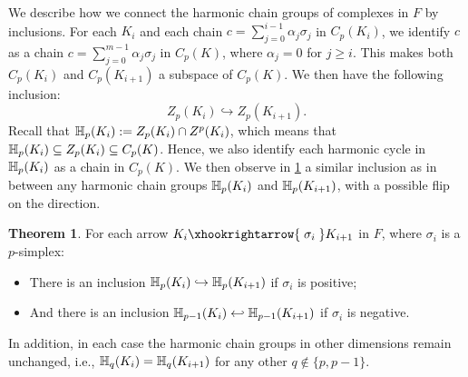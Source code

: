 \documentclass[10pt,a4paper]{amsart}
\newcommand {\mm}[1] {\ifmmode{#1}\else{\mbox{\(#1\)}}\fi}
\newcommand{\har}           {\mm{\mathbb{H}}}
\theoremstyle{definition}
\newcommand{\filt}{F}
\newcommand{\filtcnt}{m}
\newcommand{\fsimp}{\sigma}
\newcommand{\lbarrowspace}{\;}
\newcommand{\incto}{\hookrightarrow}
\newcommand{\inctosp}[1]{\xhookrightarrow{\lbarrowspace#1\lbarrowspace}}
\newcommand{\bakincto}{\hookleftarrow}
\newcommand{\Chn}{C}
\newcommand{\Zyc}{Z}
\newcommand{\aG}{\alpha}
\newtheorem{theorem}{Theorem}
\theoremstyle{remark}
\begin{document}
We describe how we connect the harmonic chain groups of complexes in $\filt$ by inclusions.
For each $K_i$ and each chain $c=\sum_{j=0}^{i-1}\aG_j\fsimp_j$ in $\Chn_p(K_i)$,
we identify $c$ as a chain $c=\sum_{j=0}^{\filtcnt-1}\aG_j\fsimp_j$ in $\Chn_p(K)$,
where $\aG_j=0$ for $j\geq i$.
This makes 
both 
$\Chn_p(K_i)$ and $\Chn_p(K_{i+1})$ a subspace of $\Chn_p(K)$. 
We then have the following inclusion:
\begin{equation}
\label{eqn:zyc-inc}
\Zyc_p(K_i) \incto \Zyc_p(K_{i+1}).
\end{equation}
Recall that $\har_p(K_i):=\Zyc_p(K_i)\cap \Zyc^p(K_i)$, which means that
$\har_p(K_i)\subseteq \Zyc_p(K_i) \subseteq \Chn_p(K)$.
Hence, we also identify each harmonic cycle in $\har_p(K_i)$ as a chain in $\Chn_p(K)$. 
We then observe in \cref{thm:harmonic-inclusion}
 a similar inclusion as in  between any harmonic chain groups $\har_p(K_i)$ and $\har_p(K_{i+1})$,
with a possible flip on the direction.
\begin{theorem}
\label{thm:harmonic-inclusion}
For each arrow $K_i \inctosp{\fsimp_i} K_{i+1}$ in $\filt$, where $\fsimp_i$ is 
a $p$-simplex:  
\begin{itemize}
\item There is an inclusion $\har_p(K_i)\incto \har_p(K_{i+1})$
if $\fsimp_i$ is positive;
\item And there is an inclusion $\har_{p-1}(K_i)\bakincto\har_{p-1}(K_{i+1})$ if $\fsimp_i$ is negative.
\end{itemize}
In addition, in each case the harmonic chain groups in other dimensions remain unchanged, i.e., $\har_q(K_i) = \har_q(K_{i+1})$ for any other $q \notin \{p, p-1\}$.
\end{theorem}
\end{document}
